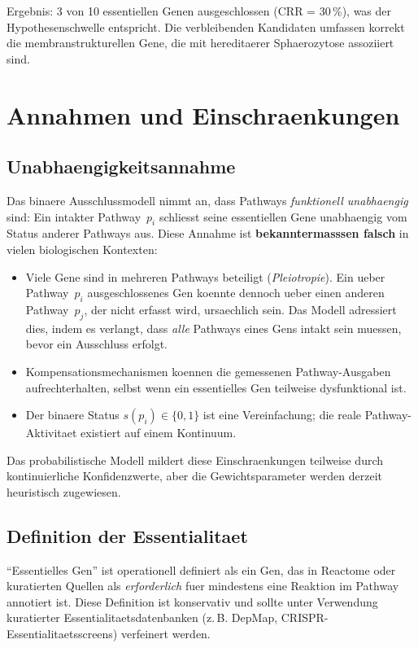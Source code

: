 \documentclass[12pt,a4paper]{article}
\begin{document}
Ergebnis: 3 von 10 essentiellen Genen ausgeschlossen (CRR = 30\,\%), was der Hypothesenschwelle entspricht. Die verbleibenden Kandidaten umfassen korrekt die membranstrukturellen Gene, die mit hereditaerer Sphaero\-zytose assoziiert sind.

\section{Annahmen und Einschraenkungen}
\label{sec:limitations}

\subsection{Unabhaengigkeitsannahme}

Das binaere Ausschlussmodell nimmt an, dass Pathways \emph{funktionell unabhaengig} sind: Ein intakter Pathway~$p_i$ schliesst seine essentiellen Gene unabhaengig vom Status anderer Pathways aus. Diese Annahme ist \textbf{bekanntermasssen falsch} in vielen biologischen Kontexten:

\begin{itemize}
    \item Viele Gene sind in mehreren Pathways beteiligt (\emph{Pleiotropie}). Ein ueber Pathway~$p_i$ ausgeschlossenes Gen koennte dennoch ueber einen anderen Pathway~$p_j$, der nicht erfasst wird, ursaechlich sein. Das Modell adressiert dies, indem es verlangt, dass \emph{alle} Pathways eines Gens intakt sein muessen, bevor ein Ausschluss erfolgt.
    \item Kompensationsmechanismen koennen die gemessenen Pathway-Ausgaben aufrechterhalten, selbst wenn ein essentielles Gen teilweise dysfunktional ist.
    \item Der binaere Status $s(p_i) \in \{0, 1\}$ ist eine Vereinfachung; die reale Pathway-Aktivitaet existiert auf einem Kontinuum.
\end{itemize}

Das probabilistische Modell mildert diese Einschraenkungen teilweise durch kontinuierliche Konfidenzwerte, aber die Gewichtsparameter werden derzeit heuristisch zugewiesen.

\subsection{Definition der Essentialitaet}

"`Essentielles Gen"' ist operationell definiert als ein Gen, das in Reactome oder kuratierten Quellen als \emph{erforderlich} fuer mindestens eine Reaktion im Pathway annotiert ist. Diese Definition ist konservativ und sollte unter Verwendung kuratierter Essentialitaetsdatenbanken (z.\,B. DepMap, CRISPR-Essentialitaetsscreens) verfeinert werden.
\end{document}
